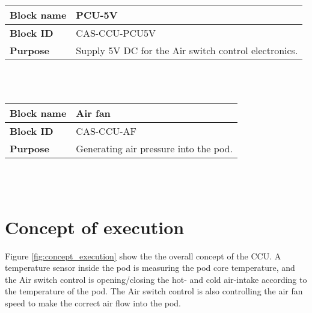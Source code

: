 \begin{tabular}{|l|p{10cm}|}
    \hline
    \textbf{Block name}     & PCU-5V \\
    \hline
    \textbf{Block ID}       & CAS-CCU-PCU5V \\
    \hline
    \textbf{Purpose}        & Supply 5V DC for the Air switch control electronics. \\
    \hline
\end{tabular}\\\\

\begin{tabular}{|l|p{10cm}|}
    \hline
    \textbf{Block name}     & Air fan \\
    \hline
    \textbf{Block ID}       & CAS-CCU-AF \\
    \hline
    \textbf{Purpose}        & Generating air pressure into the pod. \\
    \hline
\end{tabular}\\\\

\pagebreak

\section{Concept of execution}
\label{sec:concept_execution}

Figure \ref{fig:concept_execution} show the the overall concept of the CCU.
A temperature sensor inside the pod is measuring the pod core temperature, and the Air switch control is opening/closing the hot- and cold air-intake according to the temperature of the pod.
The Air switch control is also controlling the air fan speed to make the correct air flow into the pod.


